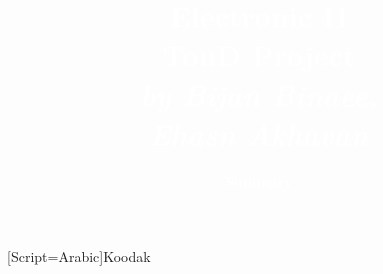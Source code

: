 

\newcommand{\confTitle}{Electronic II} %
\newcommand{\hmwkDueDate}{TonD Project} %
\newcommand{\Places}{by Bijan Binaee,} %
\newcommand{\confCompany}{Summary} %


\title{
\vspace{3.5in}
\textcolor{white}{\textmd{\fontsize{40}{40}\textbf{\confTitle}}\\
\vspace{3.75in}
\small{\hmwkDueDate}\\
\large{\textit{\Places}}\\
\vspace{-0.1in}
\large{\textit{Ehasn Akhavan}}
}
}

\author{\textcolor{white}{\textbf{\confCompany}}}
\date{} %


\newfontfamily{\arabicfont}[Script=Arabic]{Koodak}
